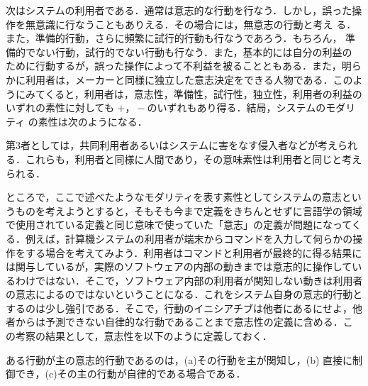 

次はシステムの利用者である．通常は意志的な行動を行なう．しかし，誤った操
作を無意識に行なうこともありえる．その場合には，無意志の行動と考え
る．また，準備的行動，さらに頻繁に試行的行動も行なうであろう．もちろん，
準備的でない行動，試行的でない行動も行なう．また，基本的には自分の利益の
ために行動するが，誤った操作によって不利益を被ることともある．また，明ら
かに利用者は，メーカーと同様に独立した意志決定をできる人物である．このよ
うにみてくると，利用者は，意志性，準備性，試行性，独立性，利用者の利益の
いずれの素性に対しても $+，-$のいずれもあり得る．結局，システムのモダリティ
の素性は次のようになる．



第3者としては，共同利用者あるいはシステムに害をなす侵入者などが考えられ
る．これらも，利用者と同様に人間であり，その意味素性は利用者と同じと考え
られる．




ところで，ここで述べたようなモダリティを表す素性としてシステムの意志とい
うものを考えようとすると，そもそも今まで定義をきちんとせずに言語学の領域
で使用されている定義と同じ意味で使っていた「意志」の定義が問題になってく
る．例えば，計算機システムの利用者が端末からコマンドを入力して何らかの操
作をする場合を考えてみよう．利用者はコマンドと利用者が最終的に得る結果に
は関与しているが，実際のソフトウェアの内部の動きまでは意志的に操作してい
るわけではない．そこで，ソフトウェア内部の利用者が関知しない動きは利用者
の意志によるのではないということになる．これをシステム自身の意志的行動と
するのは少し強引である．そこで，行動のイニシアチブは他者にあるにせよ，他
者からは予測できない自律的な行動であることまで意志性の定義に含める．こ
の考察の結果として，意志性を以下のように定義しておく．

\begin{defi}\label{isi}
ある行動が{\dg 主}の意志的行動であるのは，(a)その行動を{\dg 主}が関知し，(b)
直接に制御でき，(c)その{\dg 主}の行動が自律的である場合である．
\end{defi}

